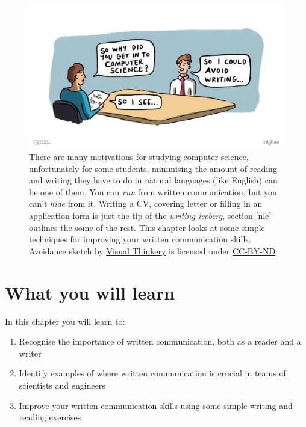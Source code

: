 \documentclass[
]{book}
\providecommand{\tightlist}{%
  \setlength{\itemsep}{0pt}\setlength{\parskip}{0pt}}
\begin{document}
\begin{figure}

{\centering \includegraphics[width=1\linewidth]{images/Avoiding writing} 

}

\caption{There are many motivations for studying computer science, unfortunately for some students, minimising the amount of reading and writing they have to do in natural languages (like English) can be one of them. You can \emph{run} from written communication, but you can't \emph{hide} from it. Writing a CV, covering letter or filling in an application form is just the tip of the \emph{writing iceberg}, section \ref{nle} outlines the some of the rest. This chapter looks at some simple techniques for improving your written communication skills. Avoidance sketch by \href{https://visualthinkery.com}{Visual Thinkery} is licensed under \href{https://creativecommons.org/licenses/by-nd/4.0/}{CC-BY-ND}}\label{fig:no-writing-fig}
\end{figure}



\hypertarget{what-you-will-learn}{%
\section{What you will learn}\label{what-you-will-learn}}

In this chapter you will learn to:

\begin{enumerate}
\def\labelenumi{\arabic{enumi}.}
\tightlist
\item
  Recognise the importance of written communication, both as a reader and a writer
\item
  Identify examples of where written communication is crucial in teams of scientists and engineers
\item
  Improve your written communication skills using some simple writing and reading exercises
\end{enumerate}
\end{document}

